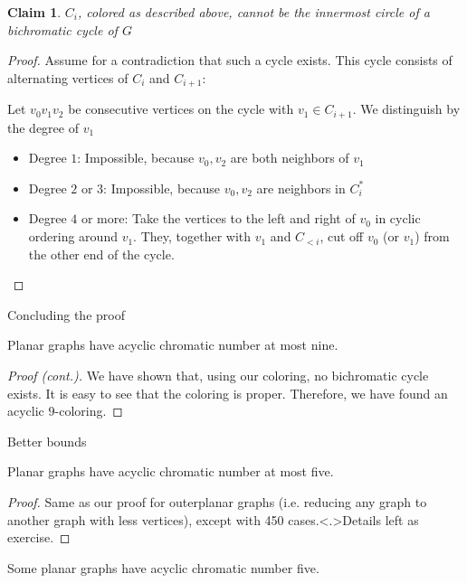 \documentclass[t]{beamer}
\newtheorem{claim}{Claim}
\begin{document}
\begin{frame}
    \begin{claim}
	$C_i$, colored as described above, cannot be the innermost circle of a bichromatic cycle of $G$
    \end{claim}
    \pause
    \begin{proof}
	Assume for a contradiction that such a cycle exists. This cycle consists of alternating vertices of $C_i$ and $C_{i+1}$:
	\pause

	Let $v_0v_1v_2$ be consecutive vertices on the cycle with $v_1\in C_{i+1}$. We distinguish by the degree of $v_1$
	\pause
	\begin{itemize}
	    \item Degree $1$: Impossible, because $v_0, v_2$ are both neighbors of $v_1$
		\pause
	    \item Degree $2$ or $3$: Impossible, because $v_0, v_2$ are neighbors in $C_{i}^*$
		\pause
	    \item Degree $4$ or more: Take the vertices to the left and right of $v_0$ in cyclic ordering around $v_1$. They, together with $v_1$ and $C_{<i}$, cut off $v_0$ (or $v_1$) from the other end of the cycle. 
	\end{itemize}
    \end{proof}
\end{frame}

\begin{frame}{Concluding the proof}
    \begin{theorem}
	Planar graphs have acyclic chromatic number at most nine.
    \end{theorem}
    \pause
    \begin{proof}[Proof (cont.)]
	We have shown that, using our coloring, no bichromatic cycle exists. \pause It is easy to see that the coloring is proper. \pause Therefore, we have found an acyclic $9$-coloring.
    \end{proof}
\end{frame}

\begin{frame}{Better bounds}
    \begin{theorem}
	Planar graphs have acyclic chromatic number at most five.
    \end{theorem}
    \pause
    \begin{proof}
	Same as our proof for outerplanar graphs (i.e. reducing any graph to another graph with less vertices), except with 450 cases.{\tiny Details left as exercise.}
    \end{proof}
    \pause
    \begin{theorem}
	Some planar graphs have acyclic chromatic number five.
    \end{theorem}
\end{frame}
\end{document}
